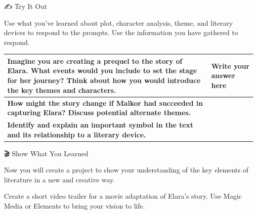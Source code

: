 \documentclass[a4paper,12pt]{article}
\newcommand{\sectionfont}[1]{{\headerfont\fontsize{20pt}{24pt}\selectfont #1}}
\newcommand{\emoji}[1]{{\emojifont #1}}
\begin{document}
\vspace{6pt}

\begin{sectionheader}
\emoji{✍️} \sectionfont{\textcolor{dark-text}{Try It Out}}
\end{sectionheader}

\vspace{4pt}

Use what you've learned about plot, character analysis, theme, and literary devices to respond to the prompts. Use the information you have gathered to respond.

\vspace{4pt}

\noindent
\begin{tabularx}{\textwidth}{|>{\cellcolor{teal-light}\raggedright\arraybackslash}X|>{\raggedright\arraybackslash}X|}
  \hline
  \textbf{\textcolor{dark-text}{Imagine you are creating a prequel to the story of Elara. What events would you include to set the stage for her journey? Think about how you would introduce the key themes and characters.}} &
  Write your answer here\par\vspace{1.5cm} \\
  \hline
  \textbf{\textcolor{dark-text}{How might the story change if Malkor had succeeded in capturing Elara? Discuss potential alternate themes.}} &
  \vspace{1.5cm} \\
  \hline
  \textbf{\textcolor{dark-text}{Identify and explain an important symbol in the text and its relationship to a literary device.}} &
  \vspace{1.5cm} \\
  \hline
\end{tabularx}

\vspace{6pt}

\begin{sectionheader}
\emoji{🎬} \sectionfont{\textcolor{dark-text}{Show What You Learned}}
\end{sectionheader}

\vspace{4pt}

Now you will create a project to show your understanding of the key elements of literature in a new and creative way.

Create a short video trailer for a movie adaptation of Elara's story. Use Magic Media or Elements to bring your vision to life.
\end{document}
